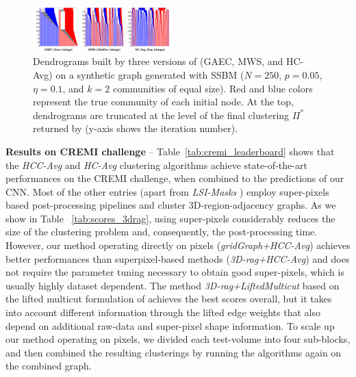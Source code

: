 \begin{figure}
\centering
\includegraphics[width=0.48\textwidth,trim=80 10 60 0, clip]{./figs/dendrograms/new_agglo_order.png} %
\caption{Dendrograms built by three versions of \algname{} (GAEC, MWS, and HC-Avg) on a synthetic graph generated with SSBM ($N=250$, $p=0.05$, $\eta=0.1$, and $k=2$ communities of equal size).  Red and blue colors represent the true community of each initial node. At the top, dendrograms are truncated at the level of the final clustering $\Pi^*$ returned by \algname{} (y-axis shows the iteration number). \label{fig:dendrograms}}
\end{figure}






\textbf{Results on CREMI challenge} -- 
Table~\ref{tab:cremi_leaderboard} shows that the \emph{HCC-Avg} and \emph{HC-Avg} clustering algorithms achieve state-of-the-art performances on the CREMI challenge, when combined to the predictions of our CNN.
Most of the other entries (apart from \emph{LSI-Masks} \cite{bailoni2020proposal}) employ super-pixels based post-processing pipelines and cluster 3D-region-adjacency graphs. As we show in Table ~\ref{tab:scores_3drag}, using super-pixels considerably reduces the size of the clustering problem and, consequently, the post-processing time. 
However, our method operating directly on pixels (\emph{gridGraph+HCC-Avg}) achieves better performances than superpixel-based methods (\emph{3D-rag+HCC-Avg}) and does not require the parameter tuning necessary to obtain good super-pixels, which is usually highly dataset dependent.
The method \emph{3D-rag+LiftedMulticut} based on the lifted multicut formulation of \cite{beier2017multicut} achieves the best scores overall, but it takes into account different information through the lifted edge weights that also depend on additional raw-data and super-pixel shape information. 
To scale up our method operating on pixels, we divided each test-volume into four sub-blocks, and then combined the resulting clusterings by running the algorithms again on the combined graph.

